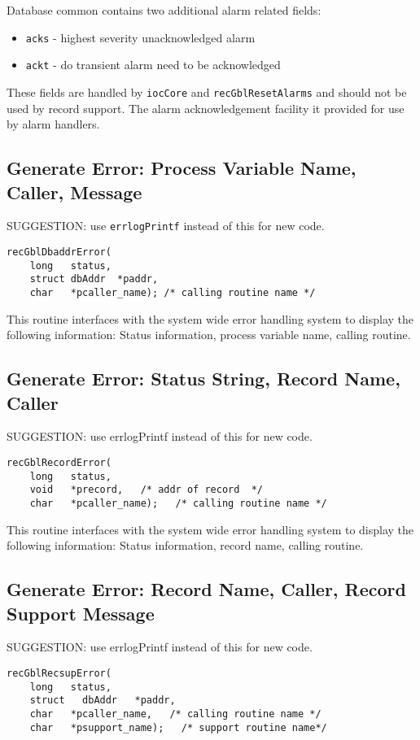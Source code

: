 Database common contains two additional alarm related fields:

\begin{itemize}
\item \verb|acks| - highest severity unacknowledged alarm
\item \verb|ackt| - do transient alarm need to be acknowledged
\end{itemize}

These fields are handled by \verb|iocCore| and \verb|recGblResetAlarms| and should not be used by record support.
The alarm acknowledgement facility it provided for use by alarm handlers.

\subsection{Generate Error: Process Variable Name, Caller, Message}

SUGGESTION: use \verb|errlogPrintf| instead of this for new code.

\begin{verbatim}
recGblDbaddrError(
    long   status,
    struct dbAddr  *paddr,
    char   *pcaller_name); /* calling routine name */
\end{verbatim}

This routine interfaces with the system wide error handling system to display the following information:
Status information, process variable name, calling routine.

\subsection{Generate Error: Status String, Record Name, Caller}
SUGGESTION: use errlogPrintf instead of this for new code.
\begin{verbatim}
recGblRecordError(
    long   status,
    void   *precord,   /* addr of record  */
    char   *pcaller_name);   /* calling routine name */
\end{verbatim}

This routine interfaces with the system wide error handling system to display the following information:
Status information, record name, calling routine.

\subsection{Generate Error: Record Name, Caller, Record Support Message}
SUGGESTION: use errlogPrintf instead of this for new code.
\begin{verbatim}
recGblRecsupError(
    long   status,
    struct   dbAddr   *paddr,
    char   *pcaller_name,   /* calling routine name */
    char   *psupport_name);   /* support routine name*/
\end{verbatim}

